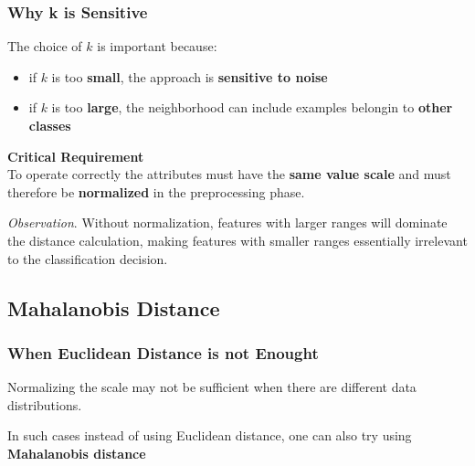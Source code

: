 \documentclass[a4paper]{article}
\theoremstyle{definition}
\begin{document}
\subsubsection{Why k is Sensitive}
The choice of \( k \) is important because:
\begin{itemize}
    \item if \( k \) is too \textbf{small}, the approach is \textbf{sensitive to noise}
    \item if \( k \) is too \textbf{large}, the neighborhood can include examples belongin to \textbf{other classes}
\end{itemize}
\begin{tcolorbox}[
    colback=yellow!15!white,
    colframe=yellow!15!white,
    boxrule=0pt,
    arc=0pt,
    halign=center
]
    \textbf{Critical Requirement}\\[0.6em]
    To operate correctly the attributes must have the \textbf{same value scale} and must therefore 
    be \textbf{normalized} in the preprocessing phase.
\end{tcolorbox}
\textit{Observation}. Without normalization, features with larger ranges will dominate the distance calculation, 
making features with smaller ranges essentially irrelevant to the classification decision.
\subsection{Mahalanobis Distance}
\subsubsection{When Euclidean Distance is not Enought}
Normalizing the scale may not be sufficient when there are different data distributions.
\begin{tcolorbox}[
    colback=magenta!15!white,
    colframe=magenta!15!white,
    boxrule=0pt,
    arc=0pt,
    halign=center
]
    In such cases instead of using Euclidean distance, one can also try using \textbf{Mahalanobis distance}
\end{tcolorbox}
\end{document}
